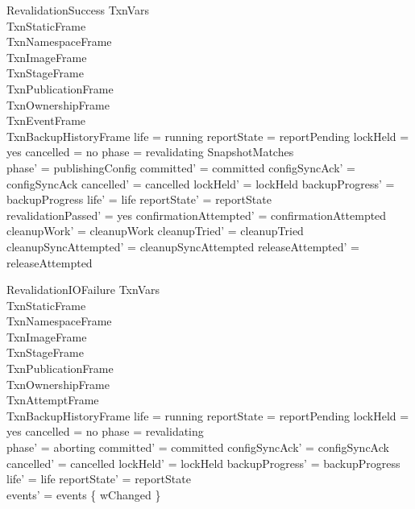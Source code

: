 \documentclass{article}
\begin{document}
\begin{schema}{RevalidationSuccess}
	\Delta TxnVars \\
	TxnStaticFrame \\
	TxnNamespaceFrame \\
	TxnImageFrame \\
	TxnStageFrame \\
	TxnPublicationFrame \\
	TxnOwnershipFrame \\
	TxnEventFrame \\
	TxnBackupHistoryFrame
	\where
	life = running \land reportState = reportPending \land lockHeld = yes \land
	cancelled = no \land phase = revalidating \land SnapshotMatches \\
	phase' = publishingConfig \land committed' = committed \land
	configSyncAck' = configSyncAck \land cancelled' = cancelled \land
	lockHeld' = lockHeld \land backupProgress' = backupProgress \land
	life' = life \land reportState' = reportState \\
	revalidationPassed' = yes \land confirmationAttempted' = confirmationAttempted \land
	cleanupWork' = cleanupWork \land cleanupTried' = cleanupTried \land
	cleanupSyncAttempted' = cleanupSyncAttempted \land
	releaseAttempted' = releaseAttempted
\end{schema}

\begin{schema}{RevalidationIOFailure}
	\Delta TxnVars \\
	TxnStaticFrame \\
	TxnNamespaceFrame \\
	TxnImageFrame \\
	TxnStageFrame \\
	TxnPublicationFrame \\
	TxnOwnershipFrame \\
	TxnAttemptFrame \\
	TxnBackupHistoryFrame
	\where
	life = running \land reportState = reportPending \land lockHeld = yes \land
	cancelled = no \land phase = revalidating \\
	phase' = aborting \land committed' = committed \land
	configSyncAck' = configSyncAck \land cancelled' = cancelled \land
	lockHeld' = lockHeld \land backupProgress' = backupProgress \land
	life' = life \land reportState' = reportState \\
	events' = events \cup \{ wChanged \}
\end{schema}
\end{document}
